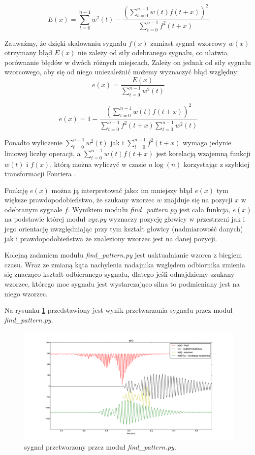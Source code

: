 \[
  E(x) = \sum_{t=0}^{n-1}  w^2(t)  - \frac {(\sum\limits_{t=0}^{n-1}  w(t) f(t+x) )^2 } { \sum\limits_{t=0}^{n-1} f^2(t+x)}
\]

Zauważmy, że dzięki skalowaniu sygnału $f(x)$ zamiast sygnał wzorcowy $w(x)$
otrzymany błąd $E(x)$ nie zależy od siły odebranego sygnału, co ułatwia porównanie błędów w dwóch różnych miejscach,
Zależy on jednak od siły sygnału wzorcowego, aby się od niego uniezależnić możemy wyznaczyć
błąd względny:
\[
  e(x) = \frac{E(x)}{\sum\limits_{t=0}^{n-1}  w^2(t)}
\]

\[
  e(x) = 1 - \frac {(\sum\limits_{t=0}^{n-1}  w(t) f(t+x) )^2 } { \sum\limits_{t=0}^{n-1} f^2(t+x) \sum\limits_{t=0}^{n-1}  w^2(t)}
\]

Ponadto wyliczenie $ \sum\limits_{t=0}^{n-1}  w^2(t) $ 
jak i $\sum\limits_{t=0}^{n-1} f^2(t+x)$ wymaga jedynie liniowej liczby operacji, a 
 $\sum\limits_{t=0}^{n-1}  w(t) f(t+x)  $ jest korelacją wzajemną funkcji $w(t)$ i $f(x)$, którą
 można wyliczyć w czasie $n \log(n)$ korzystając z szybkiej transformacji Fouriera \cite{bib:FFT_correlation}.
 
 Funkcję $e(x)$  można ją interpretować jako:
 im mniejszy błąd $e(x)$ tym większe prawdopodobieństwo, że szukany wzorzec $w$ znajduje się na pozycji $x$ w 
 odebranym sygnale $f$. 
 Wynikiem modułu \textit{find\_pattern.py} jest cała funkcja, $e(x)$ na podstawie której moduł \textit{xyz.py}
 wyznaczy pozycję głowicy w przestrzeni jak i jego orientację uwzględniając przy tym 
 kształt głowicy (nadmiarowość danych) jak i prawdopodobieństwa że znaleziony wzorzec jest na danej pozycji.
 
 Kolejną zadaniem modułu \textit{find\_pattern.py} jest uaktualnianie wzorca z biegiem czasu.
 Wraz ze zmianą kąta nachylenia nadajnika względem odbiornika zmienia się znacząco kształt odbieranego sygnału,
 dlatego jeśli odnajdziemy szukany wzorzec, którego moc sygnału jest wystarczająco silna to
 podmieniany jest na niego wzorzec.
 
 Na rysunku \ref{fig:blad_korel} przedstawiony jest wynik przetwarzania sygnału przez moduł \textit{find\_pattern.py}.
 
 \begin{figure}[h!]
    \centering
    \includegraphics[width=1.15\textwidth, trim= 47mm 0mm 0mm 0mm,clip]{blad_korel}
    \caption{sygnał przetworzony przez moduł \textit{find\_pattern.py}.}
    \label{fig:blad_korel}
\end{figure}
 


